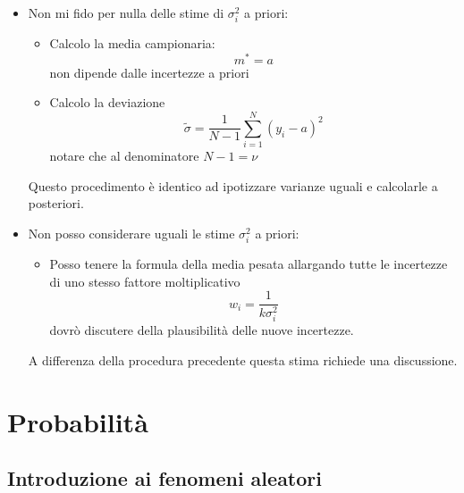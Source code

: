 \documentclass[11pt,a4paper]{book}
\begin{document}
\begin{itemize}
\item Non mi fido per nulla delle stime di $ \sigma_i^2 $ a priori:
\begin{itemize}
\item Calcolo la media campionaria:
\begin{equation}
m^* = a
\end{equation}
non dipende dalle incertezze a priori
\item Calcolo la deviazione
\begin{equation}
\tilde{\sigma} = \frac{1}{N-1} \sum\limits_{i = 1}^{N}(y_i -a)^2
\end{equation}
notare che al denominatore $ N - 1  = \nu$
\end{itemize}
Questo procedimento è identico ad ipotizzare varianze uguali e calcolarle a posteriori.
\item Non posso considerare uguali le stime $ \sigma_i^2 $ a priori:
\begin{itemize}
\item Posso tenere la formula della media pesata allargando tutte le incertezze di uno stesso fattore moltiplicativo
\begin{equation}
w_i = \frac{1}{k \sigma_i^2}
\end{equation}
dovrò discutere della plausibilità delle nuove incertezze. 
\end{itemize}
A differenza della procedura precedente questa stima richiede una discussione.
\end{itemize}
\part{Probabilità}
\chapter{Introduzione ai fenomeni aleatori} 
\end{document}
